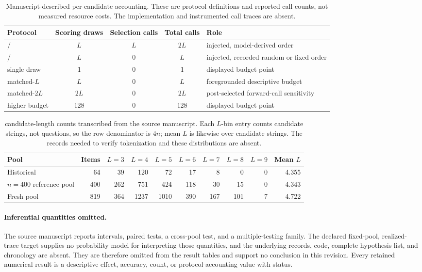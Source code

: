\begin{table}[H]
\centering
\small
\setlength{\tabcolsep}{3.8pt}
\caption{Manuscript-described per-candidate accounting.  These are protocol
definitions and reported call counts, not measured resource costs.  The
implementation and instrumented call traces are absent.}
\label{tab:compute-ledger}
\begin{tabularx}{\textwidth}{@{}P{0.25\textwidth}cccY@{}}
\toprule
Protocol & Scoring draws & Selection calls & Total calls & Role \\
\midrule
\sconf{} / \ainj{} & $L$ & $L$ & $2L$ & injected, model-derived order \\
\rinj{} / \finj{} & $L$ & 0 & $L$ & injected, recorded random or fixed order \\
\mcu{} single draw & 1 & 0 & 1 & displayed budget point \\
\mcu{} matched-$L$ & $L$ & 0 & $L$ & foregrounded descriptive budget \\
\mcu{} matched-$2L$ & $2L$ & 0 & $2L$ & post-selected forward-call sensitivity \\
\mcu{} higher budget & 128 & 0 & 128 & displayed budget point \\
\bottomrule
\end{tabularx}
\end{table}

\begin{table}[H]
\centering
\small
\setlength{\tabcolsep}{3.8pt}
\caption{\srcv{} candidate-length counts transcribed from the source
manuscript.  Each $L$-bin entry counts candidate strings, not questions, so
the row denominator is $4n$; mean $L$ is likewise over candidate strings.  The
records needed to verify tokenization and these distributions are absent.}
\label{tab:candidate-lengths}
\begin{tabular}{@{}lrrrrrrrrr@{}}
\toprule
Pool & Items & $L=3$ & $L=4$ & $L=5$ & $L=6$ & $L=7$ & $L=8$ & $L=9$ & Mean $L$ \\
\midrule
Historical & 64 & 39 & 120 & 72 & 17 & 8 & 0 & 0 & 4.355 \\
$n=400$ reference pool & 400 & 262 & 751 & 424 & 118 & 30 & 15 & 0 & 4.343 \\
Fresh pool & 819 & 364 & 1237 & 1010 & 390 & 167 & 101 & 7 & 4.722 \\
\bottomrule
\end{tabular}
\end{table}

\paragraph{Inferential quantities omitted.}
The source manuscript reports intervals, paired tests, a cross-pool test, and
a multiple-testing family.  The declared fixed-pool, realized-trace target
supplies no probability model for interpreting those quantities, and the
underlying records, code, complete hypothesis list, and chronology are absent.
They are therefore omitted from the result tables and support no conclusion in
this revision.  Every retained numerical result is a descriptive effect,
accuracy, count, or protocol-accounting value with \srcv{} status.

